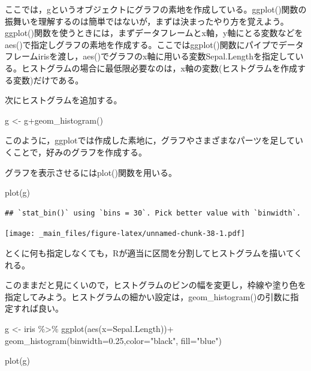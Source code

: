 \documentclass[
]{book}
\newenvironment{Shaded}{\begin{snugshade}}{\end{snugshade}}
\newcommand{\AttributeTok}[1]{\textcolor[rgb]{0.77,0.63,0.00}{#1}}
\newcommand{\FloatTok}[1]{\textcolor[rgb]{0.00,0.00,0.81}{#1}}
\newcommand{\FunctionTok}[1]{\textcolor[rgb]{0.00,0.00,0.00}{#1}}
\newcommand{\NormalTok}[1]{#1}
\newcommand{\OtherTok}[1]{\textcolor[rgb]{0.56,0.35,0.01}{#1}}
\newcommand{\SpecialCharTok}[1]{\textcolor[rgb]{0.00,0.00,0.00}{#1}}
\newcommand{\StringTok}[1]{\textcolor[rgb]{0.31,0.60,0.02}{#1}}
\begin{document}
ここでは，gというオブジェクトにグラフの素地を作成している。ggplot()関数の振舞いを理解するのは簡単ではないが，まずは決まったやり方を覚えよう。ggplot()関数を使うときには，まずデータフレームとx軸，y軸にとる変数などをaes()で指定しグラフの素地を作成する。ここではggplot()関数にパイプでデータフレームirisを渡し，aes()でグラフのx軸に用いる変数Sepal.Lengthを指定している。ヒストグラムの場合に最低限必要なのは，x軸の変数(ヒストグラムを作成する変数)だけである。

次にヒストグラムを追加する。

\begin{Shaded}
\begin{Highlighting}[]
\NormalTok{g }\OtherTok{\textless{}{-}}\NormalTok{ g}\SpecialCharTok{+}\FunctionTok{geom\_histogram}\NormalTok{()}
\end{Highlighting}
\end{Shaded}

このように，ggplotでは作成した素地に，グラフやさまざまなパーツを足していくことで，好みのグラフを作成する。

グラフを表示させるにはplot()関数を用いる。

\begin{Shaded}
\begin{Highlighting}[]
\FunctionTok{plot}\NormalTok{(g)}
\end{Highlighting}
\end{Shaded}

\begin{verbatim}
## `stat_bin()` using `bins = 30`. Pick better value with `binwidth`.
\end{verbatim}

\texttt{[image: \_main\_files/figure-latex/unnamed-chunk-38-1.pdf]}

とくに何も指定しなくても，Rが適当に区間を分割してヒストグラムを描いてくれる。

このままだと見にくいので，ヒストグラムのビンの幅を変更し，枠線や塗り色を指定してみよう。ヒストグラムの細かい設定は，geom\_histogram()の引数に指定すれば良い。

\begin{Shaded}
\begin{Highlighting}[]
\NormalTok{g }\OtherTok{\textless{}{-}}\NormalTok{ iris }\SpecialCharTok{\%\textgreater{}\%} 
  \FunctionTok{ggplot}\NormalTok{(}\FunctionTok{aes}\NormalTok{(}\AttributeTok{x=}\NormalTok{Sepal.Length))}\SpecialCharTok{+}
  \FunctionTok{geom\_histogram}\NormalTok{(}\AttributeTok{binwidth=}\FloatTok{0.25}\NormalTok{,}\AttributeTok{color=}\StringTok{"black"}\NormalTok{, }\AttributeTok{fill=}\StringTok{"blue"}\NormalTok{)}

\FunctionTok{plot}\NormalTok{(g)}
\end{Highlighting}
\end{Shaded}
\end{document}
